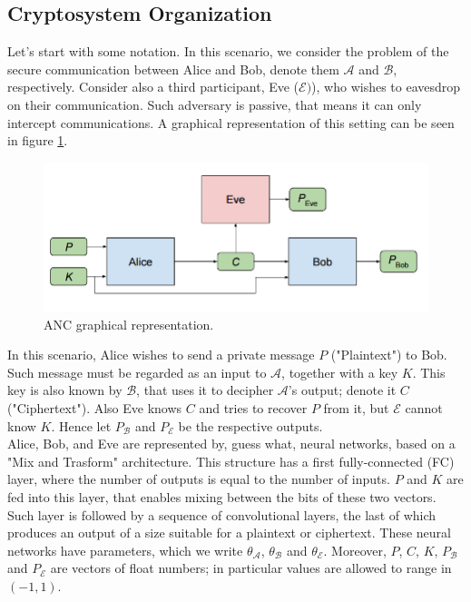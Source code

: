 \documentclass[%
    corpo=11pt,
    twoside,
    stile=classica,
    oldstyle,
    autoretitolo,
    tipotesi=magistrale,
    greek,
    evenboxes,
    english
]{toptesi}
\begin{document}
\subsection{Cryptosystem Organization}
Let's start with some notation. In this scenario, we consider the problem of the secure communication between Alice and Bob, denote them $\mathcal{A}$ and 
$\mathcal{B}$, respectively. Consider also a third participant, Eve ($\mathcal{E})$), who wishes to eavesdrop on their communication. Such adversary is passive, that means it can only intercept communications. A graphical representation of this setting can be seen in figure \ref{fig:anc}. \\
\begin{figure}[h]
\centering
\includegraphics[width=\textwidth]{pictures/anc.png}
\caption{ANC graphical representation.}
\label{fig:anc}
\end{figure}
In this scenario, Alice wishes to send a private message $P$  ("Plaintext") to Bob. Such message must be regarded as an input to $\mathcal{A}$, together with a key $K$. This key is also known by $\mathcal{B}$, that uses it to decipher $\mathcal{A}$'s output; denote it $C$ ("Ciphertext"). Also Eve knows $C$ and tries to recover $P$ from it, but $\mathcal{E}$ cannot know $K$. Hence let $P_{\mathcal{B}}$ and $P_{\mathcal{E}}$ be the respective outputs. \\
Alice, Bob, and Eve are represented by, guess what, neural networks, based on a "Mix and Trasform" architecture. This structure has a first fully-connected
(FC) layer, where the number of outputs is equal to the number of inputs. $P$ and $K$ are fed into this layer, that enables mixing between the bits of these two vectors. Such layer is followed by a sequence of convolutional layers, the last of which produces an output of a size suitable for a plaintext or ciphertext.  These neural networks have parameters, which we write $\theta_{\mathcal{A}}$, $\theta_{\mathcal{B}}$ and $\theta_{\mathcal{E}}$. Moreover, $P$, $C$, $K$, $P_{\mathcal{B}}$ and $P_{\mathcal{E}}$ are vectors of float numbers; in particular values are allowed to range in $(-1, 1)$. \\
\end{document}
